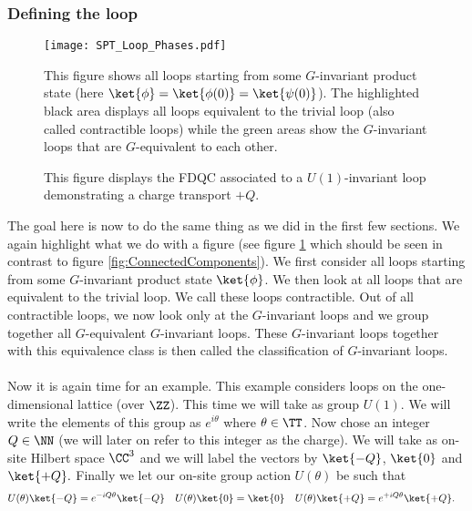 \subsubsection{Defining the loop}
\begin{figure}
	\centering
	\texttt{[image: SPT\_Loop\_Phases.pdf]}
	\caption{This figure shows all loops starting from some $G$-invariant product state (here $\ket{\phi}=\ket{\phi(0)}=\ket{\psi(0)}$). The highlighted black area displays all loops equivalent to the trivial loop (also called contractible loops) while the green areas show the $G$-invariant loops that are $G$-equivalent to each other.}
	\label{fig:ConnectedComponentsLoops}
\end{figure}
\begin{figure}
	\centering
	\scalebox{0.78}{
		
	}
	\caption{This figure displays the FDQC associated to a $U(1)$-invariant loop demonstrating a charge transport $+Q$.}
	\label{fig:U1_ThoulessPumpAs_FiniteDepthQuantumCircuit}
\end{figure}
The goal here is now to do the same thing as we did in the first few sections. We again highlight what we do with a figure (see figure \ref{fig:ConnectedComponentsLoops} which should be seen in contrast to figure \ref{fig:ConnectedComponents}). We first consider all loops starting from some $G$-invariant product state $\ket{\phi}$. We then look at all loops that are equivalent to the trivial loop. We call these loops contractible. Out of all contractible loops, we now look only at the $G$-invariant loops and we group together all $G$-equivalent $G$-invariant loops. These $G$-invariant loops together with this equivalence class is then called the classification of $G$-invariant loops.\\\\
Now it is again time for an example. This example considers loops on the one-dimensional lattice (over $\ZZ$). This time we will take as group $U(1)$. We will write the elements of this group as $e^{i\theta}$ where $\theta\in\TT$. Now chose an integer $Q\in\NN$ (we will later on refer to this integer as the charge). We will take as on-site Hilbert space $\CC^3$ and we will label the vectors by $\ket{-Q}$, $\ket{0}$ and $\ket{+Q}.$ Finally we let our on-site group action $U(\theta)$ be such that
\begin{align}
U(\theta)\ket{-Q}&=e^{-i Q\theta}\ket{-Q}&U(\theta)\ket{0}&=\ket{0}&U(\theta)\ket{+Q}&=e^{+iQ\theta}\ket{+Q}.
\end{align}

